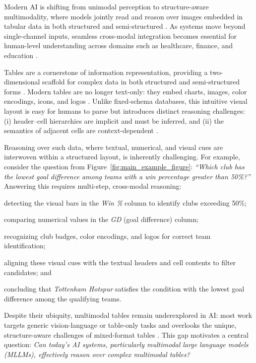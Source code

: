 \documentclass[11pt]{article}
\begin{document}
Modern AI is shifting from unimodal perception to structure-aware multimodality, where models jointly read and reason over images embedded in tabular data in both structured and semi-structured \cite{lee2023multimodality,cloutier2021using}. As systems move beyond single-channel inputs, seamless cross-modal integration becomes essential for human-level understanding across domains such as healthcare, finance, and education \cite{10.1145/3536221.3557030}.


Tables are a cornerstone of information representation, providing a two-dimensional scaffold for complex data in both structured and semi-structured forms \cite{SHWARTZZIV202284, jiang2025representation}. Modern tables are no longer text-only: they embed charts, images, color encodings, icons, and logos \cite{zheng2024multimodal}. Unlike fixed-schema databases, this intuitive visual layout is easy for humans to parse but introduces distinct reasoning challenges: (i) header–cell hierarchies are implicit and must be inferred, and (ii) the semantics of adjacent cells are context-dependent \cite{shigarov2023table}.


Reasoning over such data, where textual, numerical, and visual cues are interwoven within a structured layout, is inherently challenging. 
For example, consider the question from Figure~\ref{fig:main_example_figure}: 
\emph{“Which club has the lowest goal difference among teams with a win percentage greater than 50\%?”} 
Answering this requires multi-step, cross-modal reasoning:
\begin{inparaenum}[(1)]
    \item detecting the visual bars in the \textit{Win \%} column to identify clubs exceeding 50\%;
    \item comparing numerical values in the \textit{GD} (goal difference) column;
    \item recognizing club badges, color encodings, and logos for correct team identification;
    \item aligning these visual cues with the textual headers and cell contents to filter candidates; and
    \item concluding that \emph{Tottenham Hotspur} satisfies the condition with the lowest goal difference among the qualifying teams.
\end{inparaenum}
Despite their ubiquity, multimodal tables remain underexplored in AI: most work targets generic vision-language or table-only tasks and overlooks the unique, structure-aware challenges of mixed-format tables \cite{vaishnav2025cognitive}. 
This gap motivates a central question: \emph{Can today’s AI systems, particularly multimodal large language models (MLLMs), effectively reason over complex multimodal tables?}
\end{document}
